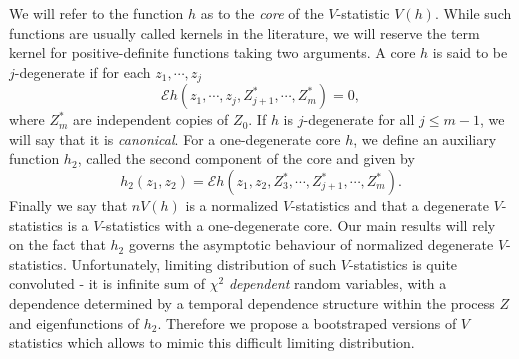 \documentclass{article} %
\newcommand{\ev}{\mathcal{E}}
\begin{document}
We will refer to the function $h$ as to the \emph{core} of the $V$-statistic $V(h)$. While such functions are usually called kernels in the literature, we will reserve the term kernel for positive-definite functions taking two arguments. A core $h$ is said to be $j$-degenerate if for each $z_1,\cdots,z_j$ 
\begin{equation}
\ev h(z_1,\cdots , z_j , Z_{j+1}^*,\cdots ,Z_m^*) = 0,
\end{equation}
where $Z_m^*$ are independent copies of $Z_0$. If $h$ is $j$-degenerate for all $j\leq m-1$, we will say that it is \emph{canonical}. For a one-degenerate core $h$, we define an auxiliary function $h_2$, called the second component of the core and given by 
\begin{equation}
h_2(z_1,z_2) = \ev h(z_1,z_2, Z_3^*,\cdots, Z_{j+1}^*,\cdots ,Z_m^*).
\end{equation}
Finally we say that $nV(h)$ is a normalized $V$-statistics and that a degenerate $V$-statistics is a $V$-statistics with a one-degenerate core. Our main results will rely on the fact that $h_2$ governs the asymptotic behaviour of normalized degenerate $V$-statistics. Unfortunately, limiting distribution of such $V$-statistics is quite convoluted - it is infinite sum of $\chi^2$ \emph{dependent} random variables, with a dependence determined by a temporal dependence structure within the process $Z$ and eigenfunctions of $h_2$. Therefore we propose a bootstraped versions of $V$ statistics which allows to mimic this difficult limiting distribution.  
\end{document}
